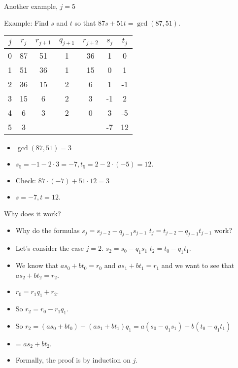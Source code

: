 \documentclass[handout]{beamer}
\begin{document}
\begin{frame}{Another example, $j=5$}

Example: Find $s$ and $t$ so that $87s+51t = \gcd(87, 51)$.

\vspace{1em}

\begin{tabular}{|c|c|c|c|c|c|c|}\hline
$j$   &  $r_{j}$    & $r_{j+1}$ & $q_{j+1}$ & $r_{j+2}$ & $s_j$ & $t_j$ \\ \hline\hline
0     &  87         &  51       &    1      &   36      &  1    &   0   \\ \hline
1     &  51         &  36       &    1      &   15      &  0    &   1   \\ \hline
2     &  36         &  15       &    2      &    6      &  1    &  -1   \\ \hline
3     &  15         &   6       &    2      &    3      & -1    &   2   \\ \hline
4     &   6         &   3       &    2      &    0      &  3    &  -5   \\ \hline
5     &   3         &           &           &           & -7    &  12   \\ \hline
\end{tabular}

\vspace{1em}

\begin{itemize}
  \item $\gcd(87,51) = 3$
  \item $s_5 = -1 - 2\cdot 3 = -7, t_5 = 2 - 2\cdot (-5) = 12$.
  \item Check: $87\cdot (-7) + 51\cdot 12 = 3$
  \item $s=-7, t=12$.
\end{itemize}


\end{frame}


\beamerdefaultoverlayspecification{<+->}

\begin{frame}{Why does it work?}
\begin{itemize}
\item Why do the formulas  $s_j=s_{j-2} - q_{j-1}s_{j-1}$ \quad $t_j=t_{j-2} - q_{j-1}t_{j-1}$ work?
\item Let's consider the case $j=2$. $s_2=s_0 - q_1s_1$ \quad $t_2=t_0 - q_1t_1$.
\item We know that $a s_0+bt_0 = r_0$ and $a s_1 + b t_1 = r_1$ and we want to see that $as_2+bt_2=r_2$.
\item $r_0 = r_1 q_1 + r_2$.
\item So $r_2 = r_0 - r_1 q_1$.
\item So $r_2 = (a s_0+bt_0) - (a s_1 + b t_1)q_1 = a(s_0 - q_1 s_1) + b(t_0 - q_1 t_1)$
\item = $as_2 + b t_2$.
\item Formally, the proof is by induction on $j$.

\end{itemize}
\end{frame}
\end{document}
